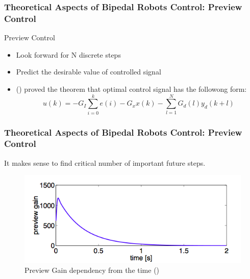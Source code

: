 \documentclass{beamer}
\begin{document}
	\begin{frame}
		\frametitle{Theoretical Aspects of Bipedal Robots Control: Preview Control}
		\begin{block}{Preview Control}
			\begin{itemize}
				\item
					 Look forward for N discrete steps
				\item
					Predict the desirable value of controlled signal
				\item
					(\cite{katayama1985design}) proved the theorem that optimal control signal has the followong form:
					\begin{equation}
						u(k) = -G_I \sum^{k}_{i=0} e(i) - G_xx(k) - \sum^{N}_{l=1}G_d(l)y_d(k+l)
					\end{equation}
			\end{itemize}
		\end{block}
	\end{frame}
	

	\begin{frame}
		\frametitle{Theoretical Aspects of Bipedal Robots Control: Preview Control}
		It makes sense to find critical number of important future steps.
		\begin{figure}[h!]
			\begin{minipage}[H]{\linewidth}
				\centering
				\includegraphics[width=0.7\linewidth]{presentation_images/16}
				\caption{Preview Gain dependency from the time (\cite{kajita2003biped})}
			\end{minipage}
		\end{figure}
	\end{frame}
	
\end{document}
